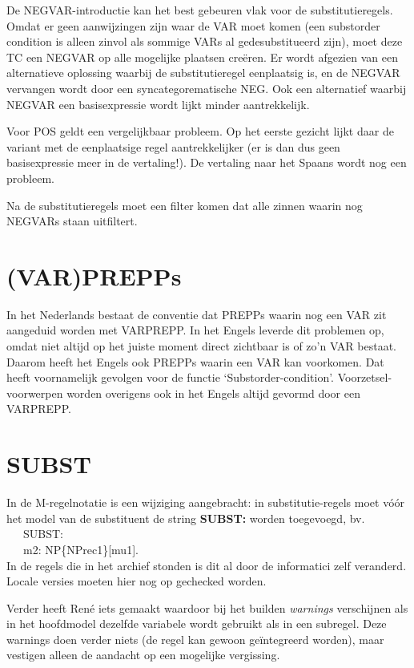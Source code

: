 De NEGVAR-introductie kan het best gebeuren vlak voor de substitutieregels. 
Omdat er geen aanwijzingen zijn waar de VAR moet komen (een substorder condition 
is alleen zinvol als sommige VARs al gedesubstitueerd zijn), moet 
deze TC een NEGVAR op alle 
mogelijke plaatsen cre\"{e}ren. Er wordt afgezien van een alternatieve oplossing
waarbij de substitutieregel eenplaatsig is, en de NEGVAR vervangen wordt door 
een syncategorematische NEG. Ook een alternatief waarbij NEGVAR een 
basisexpressie wordt lijkt minder aantrekkelijk.

Voor POS geldt een vergelijkbaar probleem. Op het eerste gezicht lijkt daar de
variant met de eenplaatsige regel aantrekkelijker (er is dan dus geen 
basisexpressie meer in de vertaling!). De vertaling naar het Spaans 
wordt nog een probleem.

Na de substitutieregels moet een filter komen dat alle zinnen waarin nog 
NEGVARs staan uitfiltert.

\section{(VAR)PREPPs}
In het Nederlands bestaat de conventie dat PREPPs waarin nog een VAR zit 
aangeduid worden met VARPREPP. In het Engels leverde dit problemen op, omdat 
niet altijd op het juiste moment direct zichtbaar is of zo'n VAR bestaat. 
Daarom heeft het Engels ook PREPPs waarin een VAR kan voorkomen. Dat heeft
voornamelijk gevolgen voor de functie `Substorder-condition'. 
Voorzetsel-voorwerpen worden overigens ook in het Engels altijd gevormd door 
een VARPREPP.

\section{SUBST}
In de M-regelnotatie is een wijziging aangebracht: in substitutie-regels moet 
v\'{o}\'{o}r het model van de substituent de string {\bf SUBST:} worden 
toegevoegd, bv.\\
\ \ \ SUBST:\\
\ \ \ m2: NP\{NPrec1\}[mu1].\\
 In de regels die in het archief stonden is dit al door de informatici 
zelf veranderd. Locale versies moeten hier nog op gechecked worden.

Verder heeft Ren\'{e} iets gemaakt waardoor bij het builden {\em warnings\/}
verschijnen als in het hoofdmodel dezelfde variabele wordt gebruikt als in een 
subregel. Deze warnings doen verder niets (de regel kan gewoon ge\"{i}ntegreerd 
worden), maar vestigen alleen de aandacht op een mogelijke vergissing.

